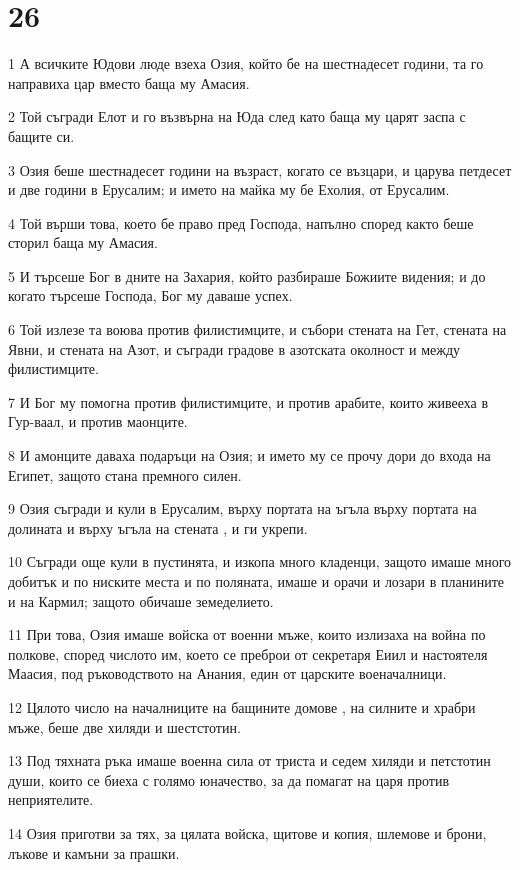 \chapter{26}

\par 1 А всичките Юдови люде взеха Озия, който бе на шестнадесет години, та го направиха цар вместо баща му Амасия.
\par 2 Той съгради Елот и го възвърна на Юда след като баща му царят заспа с бащите си.
\par 3 Озия беше шестнадесет години на възраст, когато се възцари, и царува петдесет и две години в Ерусалим; и името на майка му бе Ехолия, от Ерусалим.
\par 4 Той върши това, което бе право пред Господа, напълно според както беше сторил баща му Амасия.
\par 5 И търсеше Бог в дните на Захария, който разбираше Божиите видения; и до когато търсеше Господа, Бог му даваше успех.
\par 6 Той излезе та воюва против филистимците, и събори стената на Гет, стената на Явни, и стената на Азот, и съгради градове в азотската околност и между филистимците.
\par 7 И Бог му помогна против филистимците, и против арабите, които живееха в Гур-ваал, и против маонците.
\par 8 И амонците даваха подаръци на Озия; и името му се прочу дори до входа на Египет, защото стана премного силен.
\par 9 Озия съгради и кули в Ерусалим, върху портата на ъгъла върху портата на долината и върху ъгъла на стената , и ги укрепи.
\par 10 Съгради още кули в пустинята, и изкопа много кладенци, защото имаше много добитък и по ниските места и по поляната, имаше и орачи и лозари в планините и на Кармил; защото обичаше земеделието.
\par 11 При това, Озия имаше войска от военни мъже, които излизаха на война по полкове, според числото им, което се преброи от секретаря Еиил и настоятеля Маасия, под ръководството на Анания, един от царските военачалници.
\par 12 Цялото число на началниците на бащините домове , на силните и храбри мъже, беше две хиляди и шестстотин.
\par 13 Под тяхната ръка имаше военна сила от триста и седем хиляди и петстотин души, които се биеха с голямо юначество, за да помагат на царя против неприятелите.
\par 14 Озия приготви за тях, за цялата войска, щитове и копия, шлемове и брони, лъкове и камъни за прашки.
